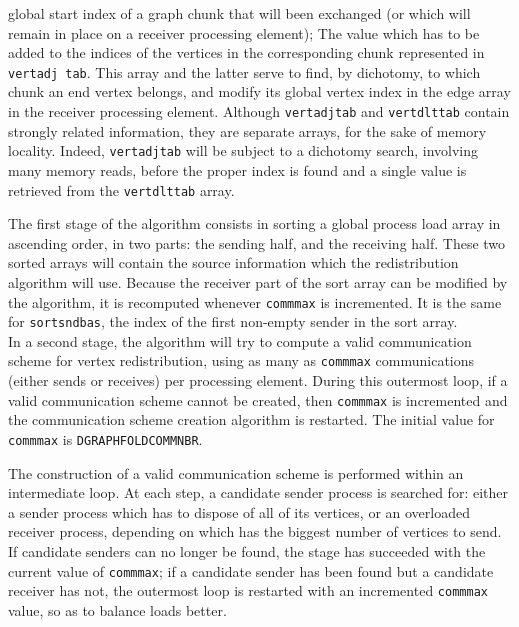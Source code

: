 \begin{itemize}
  global start index of a graph chunk that will been exchanged (or
  which will remain in place on a receiver processing element);
  The value which has to be added to the indices of the vertices in
  the corresponding chunk represented in \texttt{vert\lbt adj\lbt
  tab}. This array and the latter serve to find, by dichotomy, to
  which chunk an end vertex belongs, and modify its global vertex
  index in the edge array in the receiver processing element. Although
  \texttt{vert\lbt adj\lbt tab} and \texttt{vert\lbt dlt\lbt tab}
  contain strongly related information, they are separate arrays, for
  the sake of memory locality. Indeed, \texttt{vert\lbt adj\lbt tab}
  will be subject to a dichotomy search, involving many memory reads,
  before the proper index is found and a single value is retrieved
  from the \texttt{vert\lbt dlt\lbt tab} array.
\end{itemize}

The first stage of the algorithm consists in sorting a global process
load array in ascending order, in two parts: the sending half, and the
receiving half. These two sorted arrays will contain the source
information which the redistribution algorithm will use. Because the
receiver part of the sort array can be modified by the algorithm, it
is recomputed whenever \texttt{commmax} is incremented. It is the same
for \texttt{sort\lbt snd\lbt bas}, the index of the first non-empty
sender in the sort array.
\\

In a second stage, the algorithm will try to compute a valid
communication scheme for vertex redistribution, using as many as
\texttt{commmax} communications (either sends or receives) per
processing element. During this outermost loop, if a valid
communication scheme cannot be created, then \texttt{commmax} is
incremented and the communication scheme creation algorithm is
restarted. The initial value for \texttt{commmax} is
\texttt{DGRAPH\lbt FOLD\lbt COMM\lbt NBR}.

The construction of a valid communication scheme is performed within
an intermediate loop. At each step, a candidate sender process is
searched for: either a sender process which has to dispose of all of
its vertices, or an overloaded receiver process, depending on which
has the biggest number of vertices to send. If candidate senders can
no longer be found, the stage has succeeded with the current value of
\texttt{commmax}; if a candidate sender has been found but a candidate
receiver has not, the outermost loop is restarted with an incremented
\texttt{commmax} value, so as to balance loads better.

